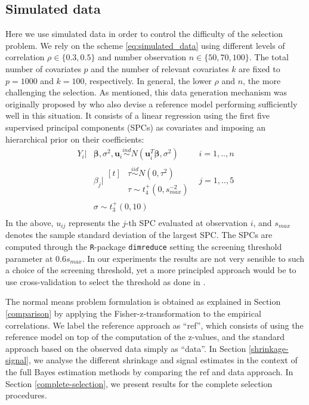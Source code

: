 \documentclass[american,]{article}
\theoremstyle{definition}
\begin{document}
\hypertarget{simulated-data}{%
\subsection{Simulated data}\label{simulated-data}}

Here we use simulated data in order to control the difficulty of the selection problem. We rely on the scheme \eqref{eq:simulated_data} using different levels of correlation $\rho\in\{0.3,0.5\}$ and number observation $n\in\{50,70,100\}$. The total number of covariates $p$ and the number of relevant covariates $k$ are fixed to $p = 1000$ and $k = 100$, respectively. In general, the lower $\rho$ and $n$, the more challenging the selection. As mentioned, this data generation mechanism was originally proposed by \cite{paper:projpred} who also devise a reference model performing sufficiently well in this situation. It consists of a linear regression using the first five supervised principal components (SPCs) \citep{bair2006prediction, piironen2018} as covariates and imposing an
hierarchical prior on their coefficients:
\
\begin{equation}
\label{eq:ref_mod}
\begin{aligned}
    Y_{i}|&\boldsymbol{\beta},\sigma^{2},\boldsymbol{u}_{i} \overset{ind}{\sim} N(\boldsymbol{u}_{i}^{T}\boldsymbol{\beta},\sigma^{2}) \quad &i=1,..,n \\
    &\beta_{j}|\!\begin{aligned}[t] &\tau \overset{iid}{\sim} N(0,\tau^{2})\\
    &\tau \sim t_{4}^{+}(0,s_{max}^{-2}) 
    \end{aligned} &j=1,..,5 \\ 
    &\sigma \sim t_{3}^{+}(0,10) \\
\end{aligned}
\end{equation}
In the above, $u_{ij}$ represents the $j$-th SPC evaluated at observation $i$, and $s_{max}$ denotes the sample standard deviation of the largest SPC.
The SPCs are computed through the \texttt{R}-package \texttt{dimreduce} setting the screening threshold parameter at $0.6s_{max}$. 
In our experiments the results are not very sensible to such a choice of the screening threshold, yet a more principled approach would be to use cross-validation to select the threshold as done in \cite{paper:projpred}.

The normal means problem formulation is obtained as explained in Section \ref{comparison} by applying the Fisher-z-transformation to the empirical correlations. We label the reference approach as ``ref'', which consists of using the reference model on top of the computation of the z-values, and the standard approach based on the observed data simply as ``data''. In Section \ref{shrinkage-signal}, we analyse the different shrinkage and signal estimates in the context of the full Bayes estimation methods by comparing the ref and data approach. In Section \ref{complete-selection}, we present results for the complete selection procedures.
\end{document}
